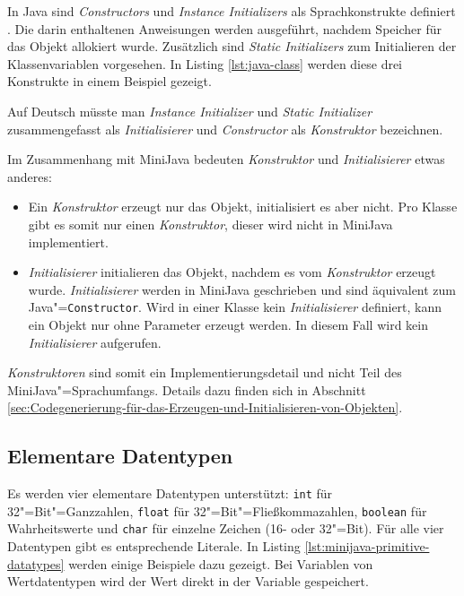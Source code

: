 In Java sind \emph{Constructors} und \emph{Instance Initializers} als Sprachkonstrukte definiert \cite{Java8Specification}. Die darin enthaltenen Anweisungen werden ausgeführt, nachdem Speicher für das Objekt allokiert wurde. Zusätzlich sind \emph{Static Initializers} zum Initialieren der Klassenvariablen vorgesehen. In Listing \ref{lst:java-class} werden diese drei Konstrukte in einem Beispiel gezeigt.



Auf Deutsch müsste man \emph{Instance Initializer} und \emph{Static Initializer} zusammengefasst als \emph{Initialisierer} und \emph{Constructor} als \emph{Konstruktor} bezeichnen.

Im Zusammenhang mit MiniJava bedeuten \emph{Konstruktor} und \emph{Initialisierer} etwas anderes:
\begin{itemize}
    \item Ein \emph{Konstruktor} erzeugt nur das Objekt, initialisiert es aber nicht. Pro Klasse gibt es somit nur einen \emph{Konstruktor}, dieser wird nicht in MiniJava implementiert. 
    \item \emph{Initialisierer} initialieren das Objekt, nachdem es vom \emph{Konstruktor} erzeugt wurde. \emph{Initialisierer} werden in MiniJava geschrieben und sind äquivalent zum Java"=\lstinline{Constructor}. Wird in einer Klasse kein \emph{Initialisierer} definiert, kann ein Objekt nur ohne Parameter erzeugt werden. In diesem Fall wird kein \emph{Initialisierer} aufgerufen.
\end{itemize}

\emph{Konstruktoren} sind somit ein Implementierungsdetail und nicht Teil des MiniJava"=Sprachumfangs. Details dazu finden sich in Abschnitt \ref{sec:Codegenerierung-für-das-Erzeugen-und-Initialisieren-von-Objekten}.

\subsection{Elementare Datentypen}

Es werden vier elementare Datentypen unterstützt: \lstinline{int} für 32"=Bit"=Ganzzahlen, \lstinline{float} für 32"=Bit"=Fließkommazahlen, \lstinline{boolean} für Wahrheitswerte und \lstinline{char} für einzelne Zeichen (16- oder 32"=Bit). Für alle vier Datentypen gibt es entsprechende Literale. In Listing \ref{lst:minijava-primitive-datatypes} werden einige Beispiele dazu gezeigt. Bei Variablen von Wertdatentypen wird der Wert direkt in der Variable gespeichert.

